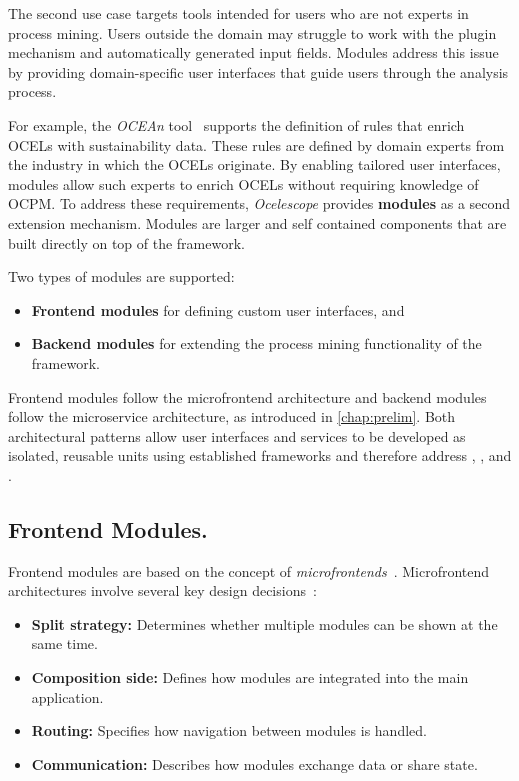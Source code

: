The second use case targets tools intended for users who are not experts in process mining.
Users outside the domain may struggle to work with the plugin mechanism and automatically generated input fields.
Modules address this issue by providing domain-specific user interfaces that guide users through the analysis process.

For example, the \textit{OCEAn} tool~\cite{ocean} supports the definition of rules that enrich OCELs with sustainability data. These rules are defined by domain experts from the industry in which the OCELs originate. By enabling tailored user interfaces, modules allow such experts to enrich OCELs without requiring knowledge of OCPM.
To address these requirements, \textit{Ocelescope} provides \textbf{modules} as a second extension mechanism.
Modules are larger and self contained components that are built directly on top of the framework.

Two types of modules are supported:
\begin{itemize}
	\item \textbf{Frontend modules} for defining custom user interfaces, and
	\item \textbf{Backend modules} for extending the process mining functionality of the framework.
\end{itemize}

Frontend modules follow the microfrontend architecture and backend modules follow the microservice architecture, as introduced in \cref{chap:prelim}.
Both architectural patterns allow user interfaces and services to be developed as isolated, reusable units using established frameworks and therefore address , , and .

\subsection{Frontend Modules.}

Frontend modules are based on the concept of \textit{microfrontends}~\cite{plugin-microservice}. Microfrontend architectures involve several key design decisions~\cite{microfrontends}:

\begin{itemize}
	\item \textbf{Split strategy:} Determines whether multiple modules can be shown at the same time.
	\item \textbf{Composition side:} Defines how modules are integrated into the main application.
	\item \textbf{Routing:} Specifies how navigation between modules is handled.
	\item \textbf{Communication:} Describes how modules exchange data or share state.
\end{itemize}

